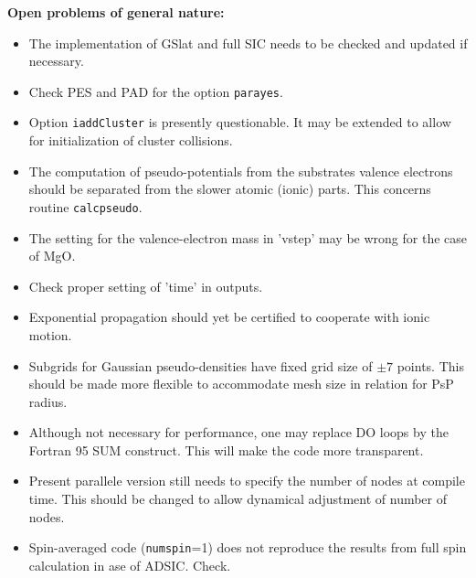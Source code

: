 \documentclass[12pt]{article}
\begin{document}
{\Large\bf Open problems of general nature:}
\begin{itemize}
  \item The implementation of GSlat and full SIC needs to be checked
        and updated if necessary.
  \item Check PES and PAD for the option  {\tt parayes}.
  \item Option {\tt iaddCluster} is presently questionable. 
        It may be extended to allow
        for initialization of cluster collisions.
  \item The computation of pseudo-potentials from the substrates
        valence electrons should be separated from the slower
        atomic (ionic) parts. This concerns routine {\tt calcpseudo}.
  \item The setting for the valence-electron mass in 'vstep'
        may be wrong for the case of MgO.
  \item Check proper setting of 'time' in outputs.
  \item Exponential propagation should yet be certified to cooperate
        with ionic motion.
  \item Subgrids for Gaussian pseudo-densities have fixed grid size
        of $\pm 7$ points. This should be made more flexible to
        accommodate mesh size in relation for PsP radius.
  \item Although not necessary for performance, one may replace
        DO loops by the Fortran 95 SUM construct. This will make the
        code more transparent.
  \item Present parallele version  still needs to specify the number
        of nodes at compile time. This should be 
        changed to allow dynamical adjustment of number of nodes.
  \item Spin-averaged code ({\tt numspin}=1) does not reproduce 
        the results from full spin calculation in ase of ADSIC.
        Check.
\end{itemize}
\end{document}
